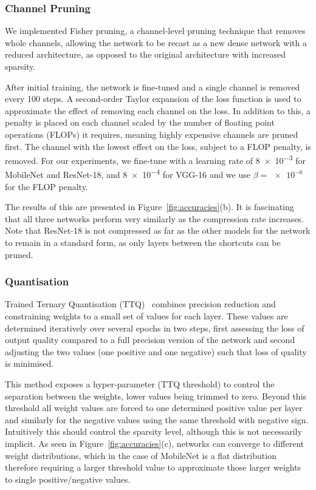 \documentclass[conference]{IEEEtran}
\begin{document}
\subsubsection{Channel Pruning}

We implemented Fisher pruning, a channel-level pruning technique that removes whole channels, allowing the network to be recast as a new dense network with a reduced architecture, as opposed to the original architecture with increased sparsity. 

After initial training, the network is fine-tuned and a single channel is removed every 100 steps. A second-order Taylor expansion of the loss function is used to approximate the effect of removing each channel on the loss. In addition to this, a penalty is placed on each channel scaled by the number of floating point operations (FLOPs) it requires, meaning highly expensive channels are pruned first. The channel with the lowest effect on the loss, subject to a FLOP penalty, is removed. For our experiments, we fine-tune with a learning rate of \num{8e-3} for MobileNet and ResNet-18, and \num{8e-4} for VGG-16 and we use $\beta=\num{e-6}$ for the FLOP penalty.

The results of this are presented in Figure~\ref{fig:accuracies}(b). It is fascinating that all three networks perform very similarly as the compression rate increases. Note that ResNet-18 is not compressed as far as the other models for the network to remain in a standard form, as only layers between the shortcuts can be pruned.

\subsubsection{Quantisation}

Trained Ternary Quantisation (TTQ)~\cite{zhu_2017_trained} combines precision reduction and constraining weights to a small set of values for each layer. These values are determined iteratively over several epochs in two steps, first assessing the loss of output quality compared to a full precision version of the network and second adjusting the two values (one positive and one negative) such that loss of quality is minimised.

This method exposes a hyper-parameter (TTQ threshold) to control the separation between the weights, lower values being trimmed to zero. Beyond this threshold all weight values are forced to one determined positive value per layer and similarly for the negative values using the same threshold with negative sign. Intuitively this should control the sparsity level, although this is not necessarily implicit. As seen in Figure~\ref{fig:accuracies}(c), networks can converge to different weight distributions, which in the case of MobileNet is a flat distribution therefore requiring a larger threshold value to approximate those larger weights to single positive/negative values.
\end{document}
